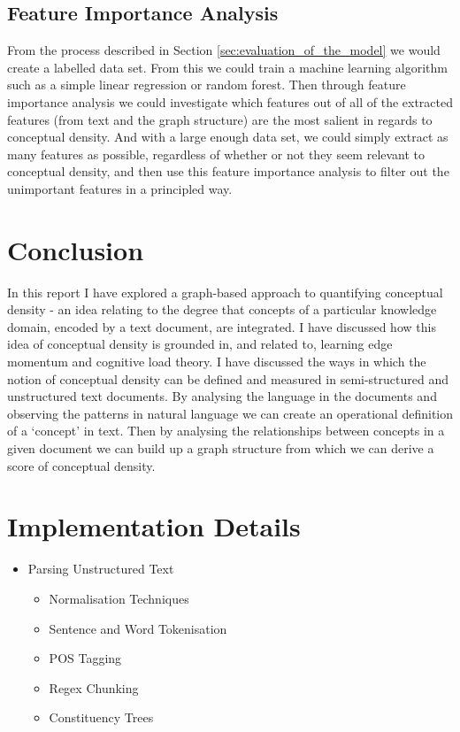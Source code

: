 \documentclass[12pt]{article}
\begin{document}
\subsection{Feature Importance Analysis}
From the process described in Section \ref{sec:evaluation_of_the_model} we would create a labelled data set. From this we could train a machine learning algorithm such as a simple linear regression or random forest. Then through feature importance analysis we could investigate which features out of all of the extracted features (from text and the graph structure) are the most salient in regards to conceptual density. And with a large enough data set, we could simply extract as many features as possible, regardless of whether or not they seem relevant to conceptual density, and then use this feature importance analysis to filter out the unimportant features in a principled way.

\section{Conclusion} \label{sec:conclusion}
In this report I have explored a graph-based approach to quantifying conceptual density - an idea relating to the degree that concepts of a particular knowledge domain, encoded by a text document, are integrated. I have discussed how this idea of conceptual density is grounded in, and related to, learning edge momentum and cognitive load theory. I have discussed the ways in which the notion of conceptual density can be defined and measured in semi-structured and unstructured text documents. By analysing the language in the documents and observing the patterns in natural language we can create an operational definition of a `concept' in text. Then by analysing the relationships between concepts in a given document we can build up a graph structure from which we can derive a score of conceptual density. 


% 



\appendix


\section{Implementation Details}
\begin{itemize}
    \item Parsing Unstructured Text
    
    \begin{itemize}
        \item Normalisation Techniques
        \item Sentence and Word Tokenisation
        \item POS Tagging
        \item Regex Chunking
        \item Constituency Trees
    \end{itemize}
\end{itemize}
\end{document}
